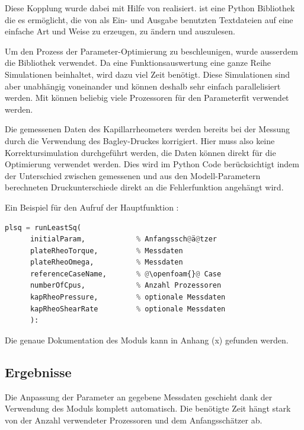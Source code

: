 Diese Kopplung wurde dabei mit Hilfe von   realisiert.  ist eine Python Bibliothek die es ermöglicht, die von \openfoam{} als Ein- und Ausgabe benutzten Textdateien auf eine einfache Art und Weise zu erzeugen, zu ändern und auszulesen.

Um den Prozess der Parameter-Optimierung zu beschleunigen, wurde ausserdem die Bibliothek  \cite{parallelpython} verwendet. Da eine Funktionsauswertung eine ganze Reihe Simulationen beinhaltet, wird dazu viel Zeit benötigt. Diese Simulationen sind aber unabhängig voneinander und können deshalb sehr einfach parallelisiert werden. Mit  können beliebig viele Prozessoren für den Parameterfit verwendet werden.

Die gemessenen Daten des Kapillarrheometers werden bereits bei der Messung durch die Verwendung des Bagley-Druckes korrigiert. Hier muss also keine Korrektursimulation durchgeführt werden, die Daten können direkt für die Optimierung verwendet werden. Dies wird im Python Code berücksichtigt indem der Unterschied zwischen gemessenen und aus den Modell-Parametern berechneten Druckunterschiede direkt an die Fehlerfunktion angehängt wird.

Ein Beispiel für den Aufruf der Hauptfunktion :
\begin{lstlisting}[language=Python]
plsq = runLeastSq(
      initialParam,            % Anfangssch@ä@tzer
      plateRheoTorque,         % Messdaten
      plateRheoOmega,          % Messdaten
      referenceCaseName,       % @\openfoam{}@ Case
      numberOfCpus,            % Anzahl Prozessoren
      kapRheoPressure,         % optionale Messdaten
      kapRheoShearRate         % optionale Messdaten
      ):  
\end{lstlisting}
%
Die genaue Dokumentation des Moduls kann in Anhang (x)  gefunden werden.
%
\subsection{Ergebnisse}
Die Anpassung der Parameter an gegebene Messdaten geschieht dank der Verwendung des  Moduls komplett automatisch. 
Die benötigte Zeit hängt stark von der Anzahl verwendeter Prozessoren und dem Anfangsschätzer ab.
%
